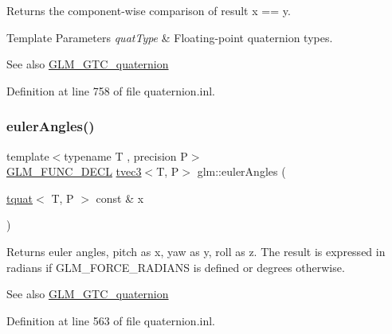 Returns the component-\/wise comparison of result x == y.


\begin{DoxyTemplParams}{Template Parameters}
{\em quat\+Type} & Floating-\/point quaternion types.\\
\hline
\end{DoxyTemplParams}
\begin{DoxySeeAlso}{See also}
\mbox{\hyperlink{group__gtc__quaternion}{G\+L\+M\+\_\+\+G\+T\+C\+\_\+quaternion}} 
\end{DoxySeeAlso}


Definition at line 758 of file quaternion.\+inl.

\mbox{\label{group__gtc__quaternion_gadb92ec1c1b0dd6b024176a73fbef3e64}} 
\subsubsection{\texorpdfstring{eulerAngles()}{eulerAngles()}}
{\footnotesize\ttfamily template$<$typename T , precision P$>$ \\
\mbox{\hyperlink{setup_8hpp_ab2d052de21a70539923e9bcbf6e83a51}{G\+L\+M\+\_\+\+F\+U\+N\+C\+\_\+\+D\+E\+CL}} \mbox{\hyperlink{structglm_1_1tvec3}{tvec3}}$<$T, P$>$ glm\+::euler\+Angles (\begin{DoxyParamCaption}\item[{\mbox{\hyperlink{structglm_1_1tquat}{tquat}}$<$ T, P $>$ const \&}]{x }\end{DoxyParamCaption})}

Returns euler angles, pitch as x, yaw as y, roll as z. The result is expressed in radians if G\+L\+M\+\_\+\+F\+O\+R\+C\+E\+\_\+\+R\+A\+D\+I\+A\+NS is defined or degrees otherwise.

\begin{DoxySeeAlso}{See also}
\mbox{\hyperlink{group__gtc__quaternion}{G\+L\+M\+\_\+\+G\+T\+C\+\_\+quaternion}} 
\end{DoxySeeAlso}


Definition at line 563 of file quaternion.\+inl.

\mbox{\label{group__gtc__quaternion_ga09d21a588ae425ac7517ea65cc59a5ae}} 
